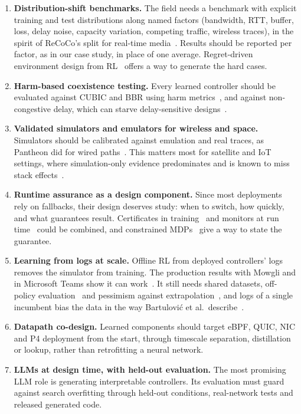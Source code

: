 \begin{enumerate}
  \item \textbf{Distribution-shift benchmarks.} The field needs a benchmark with explicit training and test distributions along named factors (bandwidth, RTT, buffer, loss, delay noise, capacity variation, competing traffic, wireless traces), in the spirit of ReCoCo's split for real-time media~\cite{markudova2026advancing}. Results should be reported per factor, as in our case study, in place of one average. Regret-driven environment design from RL~\cite{dennis2020emergent} offers a way to generate the hard cases.
  \item \textbf{Harm-based coexistence testing.} Every learned controller should be evaluated against CUBIC and BBR using harm metrics~\cite{ware2019beyond}, and against non-congestive delay, which can starve delay-sensitive designs~\cite{arun2022starvation}.
  \item \textbf{Validated simulators and emulators for wireless and space.} Simulators should be calibrated against emulation and real traces, as Pantheon did for wired paths~\cite{yan2018pantheon}. This matters most for satellite and IoT settings, where simulation-only evidence predominates and is known to miss stack effects~\cite{valentine2026emulation}.
  \item \textbf{Runtime assurance as a design component.} Since most deployments rely on fallbacks, their design deserves study: when to switch, how quickly, and what guarantees result. Certificates in training~\cite{yang2024canopy} and monitors at run time~\cite{rotman2020online} could be combined, and constrained MDPs~\cite{altman1999constrained} give a way to state the guarantee.
  \item \textbf{Learning from logs at scale.} Offline RL from deployed controllers' logs~\cite{yen2023sage,khairy2024acm} removes the simulator from training. The production results with Mowgli and in Microsoft Teams show it can work~\cite{agarwal2025mowgli,khairy2026human}. It still needs shared datasets, off-policy evaluation~\cite{fu2021benchmarks} and pessimism against extrapolation~\cite{jia2026pocc}, and logs of a single incumbent bias the data in the way Bartulovi\'c et al.\ describe~\cite{bartulovic2017biases}.
  \item \textbf{Datapath co-design.} Learned components should target eBPF, QUIC, NIC and P4 deployment from the start, through timescale separation, distillation or lookup, rather than retrofitting a neural network.
  \item \textbf{LLMs at design time, with held-out evaluation.} The most promising LLM role is generating interpretable controllers. Its evaluation must guard against search overfitting through held-out conditions, real-network tests and released generated code.

\end{enumerate}
